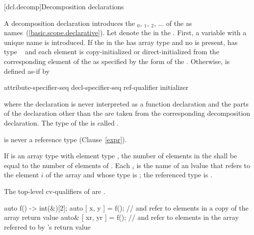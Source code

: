 [dcl.decomp]{Decomposition declarations}%
%
%

\pnum
A decomposition declaration introduces the 
$_0$, $_1$, $_2$, ...
of the
 as names~(\ref{basic.scope.declarative}).
Let \cv{} denote the
 in the . First, a
variable with a unique name  is introduced. If the
 in the 
has array type  and no  is present, 
has type \cv{}~ and each element is copy-initialized or direct-initialized
from the corresponding element of the  as specified
by the form of the .
Otherwise, 
is defined as-if by

\begin{ncbnf}
attribute-specifier-seq\opt{} decl-specifier-seq ref-qualifier\opt{}  initializer \terminal{;}
\end{ncbnf}

where
the declaration is never interpreted as a function declaration and
the parts of the declaration other than the  are taken
from the corresponding decomposition declaration. The type of the 
 is called .
\begin{note}
 is never a reference type (Clause~\ref{expr}).
\end{note}

\pnum
If  is an array type with element type , the number
of elements in the  shall be equal to the
number of elements of . Each $_i$ is the name of an
lvalue that refers to the element $i$ of the array and whose type
is ; the referenced type is .
\begin{note}
The top-level cv-qualifiers of  are \cv.
\end{note}
\begin{example}
\begin{codeblock}
  auto f() -> int(&)[2];
  auto [ x, y ] = f();          //  and  refer to elements in a copy of the array return value
  auto& [ xr, yr ] = f();       //  and  refer to elements in the array referred to by 's return value
\end{codeblock}
\end{example}

